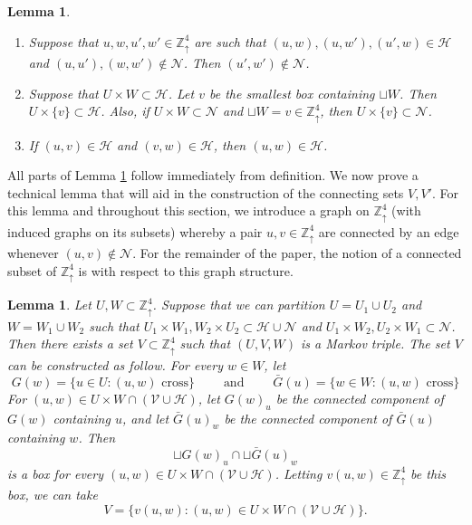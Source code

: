 \documentclass[aop, preprint]{imsart}
\theoremstyle{plain}
\newtheorem{lemma}[theorem]{Lemma}
\theoremstyle{definition}
\theoremstyle{plain}
\newcommand{\sset}{\subset}
\newcommand{\mathand}{\;\text{and}\;}
\newcommand{\Zd}{\mathds{Z}^4_\uparrow}
\newcommand{\scrV}{\mathcal{V}}
\newcommand{\scrH}{\mathcal{H}}
\newcommand{\scrN}{\mathcal{N}}
\newcommand{\X}{\times}
\begin{document}
\begin{lemma}
	\label{L:easy-observations}
	\begin{enumerate}[nosep, label=(\roman*)]
		\item Suppose that $u, w, u', w' \in \Zd$ are such that $(u, w), (u, w'), (u', w) \in \scrH$ and $(u, u'), (w, w') \notin \scrN$. Then $(u', w') \notin \scrN$.
		\item Suppose that $U \X W \sset \scrH$. Let $v$ be the smallest box containing $\sqcup W$. Then $U \X \{v\} \sset \scrH$. Also, if $U \X W \sset \scrN$ and $\sqcup W = v \in \Zd$, then $U \X \{v\} \sset \scrN$.
		\item If $(u, v) \in \scrH$ and $(v, w) \in \scrH$, then $(u, w) \in \scrH$.
	\end{enumerate}
\end{lemma}

All parts of Lemma \ref{L:easy-observations} follow immediately from definition. We now prove a technical lemma that will aid in the construction of the connecting sets $V, V'$. For this lemma and throughout this section, we introduce a graph on $\Zd$ (with induced graphs on its subsets) whereby a pair $u, v \in \Zd$ are connected by an edge whenever $(u, v) \notin \scrN$. For the remainder of the paper, the notion of a connected subset of $\Zd$ is with respect to this graph structure.

\begin{lemma}
	\label{L:shift}
	Let $U, W \sset \Zd$. Suppose that we can partition $U = U_1 \cup U_2$ and $W = W_1 \cup W_2$ such that $U_1 \X W_1, W_2 \X U_2 \sset \scrH \cup \scrN$ and $U_1 \X W_2, U_2 \X W_1 \sset \scrN$. Then there exists a set $V \sset \Zd$ such that $(U, V, W)$ is a Markov triple. The set $V$ can be constructed as follow.
	For every $w \in W$, let 
	$$
	G(w) = \{u \in U : (u, w) \text{ cross}\} \qquad \mathand \qquad  \bar G(u) = \{w \in W : (u, w) \text{ cross}\}
	$$
	For $(u, w) \in U \X W \cap (\scrV \cup \scrH)$, let $G(w)_u$ be the connected component of $G(w)$ containing $u$, and let $\bar G(u)_w$ be the connected component of $\bar G(u)$ containing $w$. Then
	$$
	\sqcup G(w)_u \cap \sqcup \bar G(u)_w
	$$
	is a box for every $(u, w) \in U \X W \cap (\scrV \cup \scrH)$. Letting $v(u, w) \in \Zd$ be this box, we can take
	$$
	V  = \{v(u, w) : (u, w) \in U \X W \cap (\scrV \cup \scrH) \}.
	$$
\end{lemma}
\end{document}
